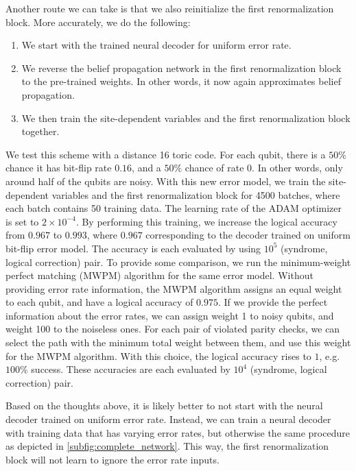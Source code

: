 Another route we can take is that we also reinitialize the first renormalization block.
More accurately, we do the following:
\begin{enumerate}
	\item We start with the trained neural decoder for uniform error rate.
	\item We reverse the belief propagation network in the first renormalization block to the pre-trained weights. In other words, it now again approximates belief propagation.
	\item We then train the site-dependent variables and the first renormalization block together.
\end{enumerate}
We test this scheme with a distance 16 toric code.
For each qubit, there is a $50\%$ chance it has bit-flip rate $0.16$, and a $50\%$ chance of rate $0$.
In other words, only around half of the qubits are noisy.
With this new error model, we train the site-dependent variables and the first renormalization block for 4500 batches, where each batch contains 50 training data.
The learning rate of the ADAM optimizer is set to $2\times 10^{-4}$.
By performing this training, we increase the logical accuracy from $0.967$ to $0.993$, where $0.967$ corresponding to the decoder trained on uniform bit-flip error model.
The accuracy is each evaluated by using $10^5$ (syndrome, logical correction) pair.
To provide some comparison, we run the minimum-weight perfect matching (MWPM) algorithm for the same error model.
Without providing error rate information, the MWPM algorithm assigns an equal weight to each qubit, and have a logical accuracy of $0.975$.
If we provide the perfect information about the error rates, we can assign weight 1 to noisy qubits, and weight 100 to the noiseless ones.
For each pair of violated parity checks, we can select the path with the minimum total weight between them, and use this weight for the MWPM algorithm.
With this choice, the logical accuracy rises to $1$, e.g. $100\%$ success.
These accuracies are each evaluated by $10^4$ (syndrome, logical correction) pair.

Based on the thoughts above, it is likely better to not start with the neural decoder trained on uniform error rate.
Instead, we can train a neural decoder with training data that has varying error rates, but otherwise the same procedure as depicted in \autoref{subfig:complete_network}.
This way, the first renormalization block will not learn to ignore the error rate inputs.